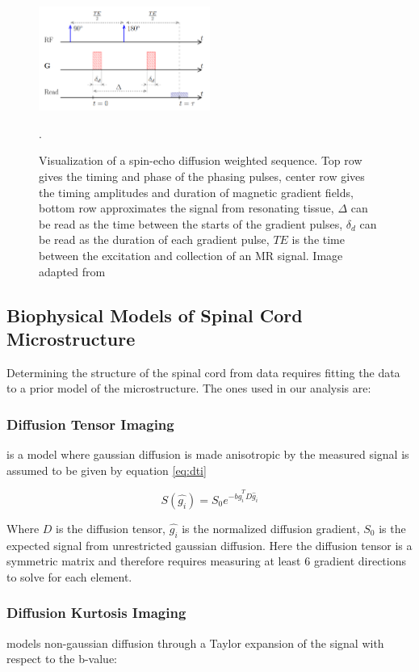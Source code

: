 \begin{figure}
    \includegraphics[width=0.5\textwidth]{figures/sequence.png}
    \caption{Visualization of a spin-echo diffusion weighted sequence. Top row gives the timing and phase of the \dmri phasing pulses, center row gives the timing amplitudes and duration of magnetic gradient fields, bottom row approximates the signal from resonating tissue, $\Delta$ can be read as the time between the starts of the gradient pulses, $\delta_d$ can be read as the duration of each gradient pulse, $TE$ is the time between the excitation and collection of an MR signal. Image adapted from \cite{rohmer2006bloch}}.
    \label{fig:sequence}
\end{figure}

\subsection{Biophysical Models of Spinal Cord Microstructure}
Determining the structure of the spinal cord from \dmri data requires fitting the data to a prior model of the microstructure. The ones used in our analysis are:

\subsubsection{Diffusion Tensor Imaging}
\dti is a model where gaussian diffusion is made anisotropic by
 the measured signal is assumed to be given by equation \ref{eq:dti}

\begin{equation}
    S(\hat{g_i}) = S_0 e^{-b \hat{g}_i^T D \hat{g}_i}
    \label{eq:dti}
\end{equation}

Where $D$ is the diffusion tensor, $\hat{g_i}$ is the normalized diffusion gradient, $S_0$ is the expected signal from unrestricted gaussian diffusion. Here the diffusion tensor is a symmetric matrix and therefore requires measuring at least 6 gradient directions to solve for each element. \cite{vedantam2014diffusion}

\subsubsection{Diffusion Kurtosis Imaging}
\dki models non-gaussian diffusion through a Taylor expansion of the signal with respect to the b-value:

